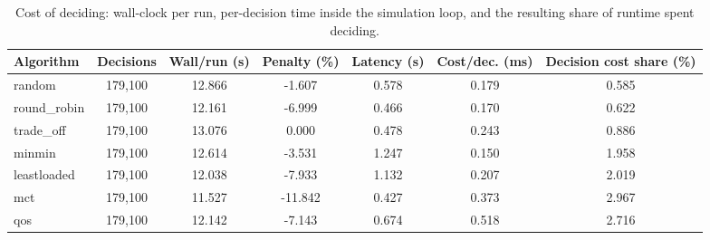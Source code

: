 \begin{table}
\centering
\scriptsize
\caption{Cost of deciding: wall-clock per run, per-decision time inside the simulation loop, and the resulting share of runtime spent deciding.}
\label{tab:p1-decision-overhead}
\begin{tabular}{lcccccc}
\toprule
Algorithm & Decisions & Wall/run (s) & Penalty (\%) & Latency (s) & Cost/dec. (ms) & Decision cost share (\%) \\
\midrule
random & 179,100 & 12.866 & -1.607 & 0.578 & 0.179 & 0.585 \\
round\_robin & 179,100 & 12.161 & -6.999 & 0.466 & 0.170 & 0.622 \\
trade\_off & 179,100 & 13.076 & 0.000 & 0.478 & 0.243 & 0.886 \\
minmin & 179,100 & 12.614 & -3.531 & 1.247 & 0.150 & 1.958 \\
leastloaded & 179,100 & 12.038 & -7.933 & 1.132 & 0.207 & 2.019 \\
mct & 179,100 & 11.527 & -11.842 & 0.427 & 0.373 & 2.967 \\
qos & 179,100 & 12.142 & -7.143 & 0.674 & 0.518 & 2.716 \\
\bottomrule
\end{tabular}
\par\vspace{2pt}{\footnotesize\raggedright Decision cost is the CPU time of the decision routine itself, separated from the simulated scheduling delay; the two must not be confused when ranking algorithms.\par}
\end{table}
